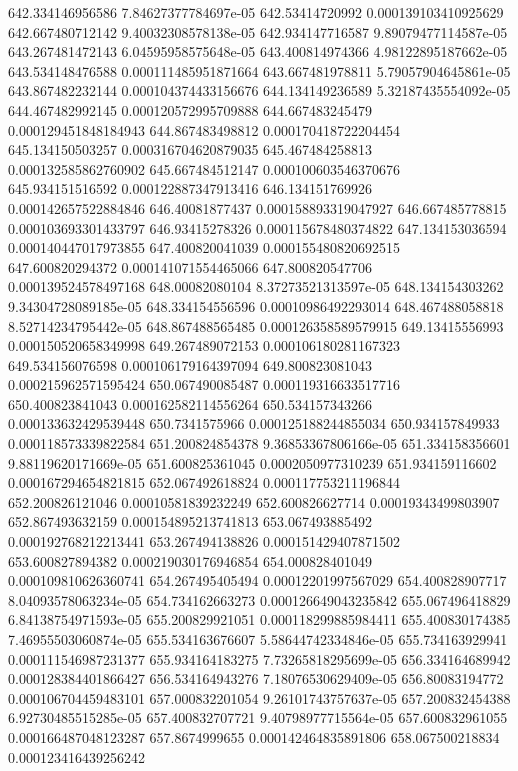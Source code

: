 {642.334146956586 7.84627377784697e-05
642.53414720992 0.000139103410925629
642.667480712142 9.40032308578138e-05
642.934147716587 9.89079477114587e-05
643.267481472143 6.04595958575648e-05
643.400814974366 4.98122895187662e-05
643.534148476588 0.000111485951871664
643.667481978811 5.79057904645861e-05
643.867482232144 0.000104374433156676
644.134149236589 5.32187435554092e-05
644.467482992145 0.000120572995709888
644.667483245479 0.000129451848184943
644.867483498812 0.000170418722204454
645.134150503257 0.000316704620879035
645.467484258813 0.000132585862760902
645.667484512147 0.000100603546370676
645.934151516592 0.000122887347913416
646.134151769926 0.000142657522884846
646.40081877437 0.000158893319047927
646.667485778815 0.000103693301433797
646.93415278326 0.000115678480374822
647.134153036594 0.000140447017973855
647.400820041039 0.000155480820692515
647.600820294372 0.000141071554465066
647.800820547706 0.000139524578497168
648.00082080104 8.37273521313597e-05
648.134154303262 9.34304728089185e-05
648.334154556596 0.00010986492293014
648.467488058818 8.52714234795442e-05
648.867488565485 0.000126358589579915
649.13415556993 0.000150520658349998
649.267489072153 0.000106180281167323
649.534156076598 0.000106179164397094
649.800823081043 0.000215962571595424
650.067490085487 0.000119316633517716
650.400823841043 0.000162582114556264
650.534157343266 0.000133632429539448
650.7341575966 0.000125188244855034
650.934157849933 0.000118573339822584
651.200824854378 9.36853367806166e-05
651.334158356601 9.88119620171669e-05
651.600825361045 0.0002050977310239
651.934159116602 0.000167294654821815
652.067492618824 0.000117753211196844
652.200826121046 0.00010581839232249
652.600826627714 0.00019343499803907
652.867493632159 0.000154895213741813
653.067493885492 0.000192768212213441
653.267494138826 0.000151429407871502
653.600827894382 0.000219030176946854
654.000828401049 0.000109810626360741
654.267495405494 0.00012201997567029
654.400828907717 8.04093578063234e-05
654.734162663273 0.000126649043235842
655.067496418829 6.84138754971593e-05
655.200829921051 0.000118299885984411
655.400830174385 7.46955503060874e-05
655.534163676607 5.58644742334846e-05
655.734163929941 0.000111546987231377
655.934164183275 7.73265818295699e-05
656.334164689942 0.000128384401866427
656.534164943276 7.18076530629409e-05
656.80083194772 0.000106704459483101
657.000832201054 9.26101743757637e-05
657.200832454388 6.92730485515285e-05
657.400832707721 9.40798977715564e-05
657.600832961055 0.000166487048123287
657.8674999655 0.000142464835891806
658.067500218834 0.000123416439256242
}
